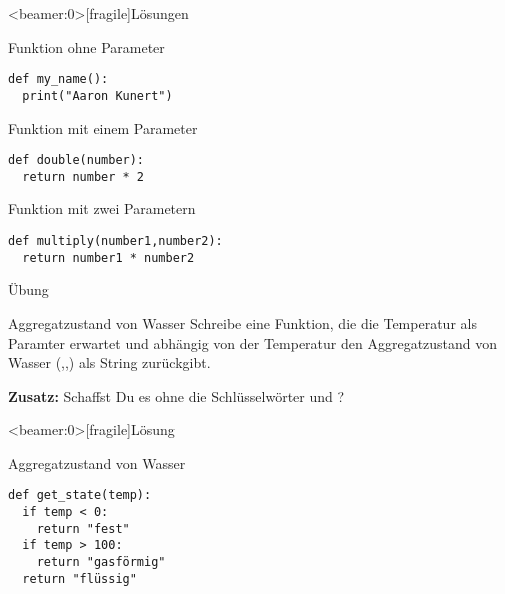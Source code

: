\begin{frame}<beamer:0>[fragile]{Lösungen}

\begin{solutionblock}{Funktion ohne Parameter}
\begin{verbatim}
def my_name(): 
  print("Aaron Kunert")
\end{verbatim}
\end{solutionblock}

\vspace{12pt}

\begin{solutionblock}{Funktion mit einem Parameter}
\begin{verbatim}
def double(number): 
  return number * 2
\end{verbatim}
\end{solutionblock}

\vspace{12pt}

\begin{solutionblock}{Funktion mit zwei Parametern}
\begin{verbatim}
def multiply(number1,number2): 
  return number1 * number2
\end{verbatim}
\end{solutionblock}


\end{frame}

\begin{frame}{Übung}
\begin{block}{Aggregatzustand von Wasser}
\vspace{2pt}
Schreibe eine Funktion, die die Temperatur als Paramter erwartet und abhängig von der Temperatur den Aggregatzustand von Wasser (,,) als String zurückgibt. 
\pause 

\textbf{Zusatz:} Schaffst Du es ohne die Schlüsselwörter  und ? 
\end{block}
\end{frame}

\begin{frame}<beamer:0>[fragile]{Lösung}

\begin{solutionblock}{Aggregatzustand von Wasser}
\begin{verbatim}
def get_state(temp):
  if temp < 0:
    return "fest"
  if temp > 100:
    return "gasförmig"
  return "flüssig"
\end{verbatim}
\end{solutionblock}

\end{frame}


